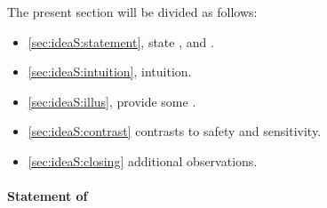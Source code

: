 \begin{note}
  The present section will be divided as follows:
  \begin{itemize}
  \item \autoref{sec:ideaS:statement}, state \ideaS{}, and \sink{}.
  \item \autoref{sec:ideaS:intuition}, intuition.
  \item \autoref{sec:ideaS:illus}, provide some .
  \item \autoref{sec:ideaS:contrast} contrasts to safety and sensitivity.
  \item \autoref{sec:ideaS:closing} additional observations.
  \end{itemize}
\end{note}

\paragraph{Statement of \ideaS{}}
\label{sec:ideaS:statement}

